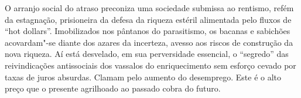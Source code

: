 O arranjo social do atraso preconiza uma sociedade submissa ao rentismo,
refém da estagnação, prisioneira da defesa da riqueza estéril alimentada
pelo fluxos de ``hot dollars''. Imobilizados nos pântanos do
parasitismo, os bacanas e sabichões acovardam"-se diante dos azares da
incerteza, avesso aos riscos de construção da nova riqueza. Aí está
desvelado, em sua perversidade essencial, o ``segredo'' das
reivindicações antissociais dos vassalos do enriquecimento sem esforço
cevado por taxas de juros absurdas. Clamam pelo aumento do desemprego.
Este é o alto preço que o presente agrilhoado ao passado cobra do
futuro.
